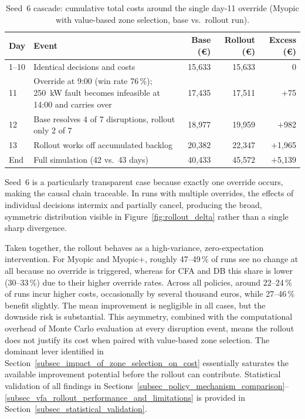 \documentclass[12pt,oneside]{article}
\begin{document}
\begin{table}[H]
\centering
\caption{Seed~6 cascade: cumulative total costs around the single day-11 override (Myopic with value-based zone selection, base vs.\ rollout run).}
\label{tab:seed6_cascade}
\begin{tabular}{lp{5.8cm}rrr}
\toprule
Day & Event & Base (€) & Rollout (€) & Excess (€) \\
\midrule
1--10 & Identical decisions and costs & 15{,}633 & 15{,}633 & 0 \\
11 & Override at 9:00 (win rate 76\,\%); 250~kW fault becomes infeasible at 14:00 and carries over & 17{,}435 & 17{,}511 & $+$75 \\
12 & Base resolves 4 of 7 disruptions, rollout only 2 of 7 & 18{,}977 & 19{,}959 & $+$982 \\
13 & Rollout works off accumulated backlog & 20{,}382 & 22{,}347 & $+$1{,}965 \\
End & Full simulation (42 vs.\ 43 days) & 40{,}433 & 45{,}572 & $+$5{,}139 \\
\bottomrule
\end{tabular}
\end{table}

Seed~6 is a particularly transparent case because exactly one override occurs, making the causal chain traceable. In runs with multiple overrides, the effects of individual decisions intermix and partially cancel, producing the broad, symmetric distribution visible in Figure~\ref{fig:rollout_delta} rather than a single sharp divergence.

Taken together, the rollout behaves as a high-variance, zero-expectation intervention. For Myopic and Myopic+, roughly 47--49\,\% of runs see no change at all because no override is triggered, whereas for CFA and DB this share is lower (30--33\,\%) due to their higher override rates. Across all policies, around 22--24\,\% of runs incur higher costs, occasionally by several thousand euros, while 27--46\,\% benefit slightly. The mean improvement is negligible in all cases, but the downside risk is substantial. This asymmetry, combined with the computational overhead of Monte Carlo evaluation at every disruption event, means the rollout does not justify its cost when paired with value-based zone selection. The dominant lever identified in Section~\ref{subsec_impact_of_zone_selection_on_cost} essentially saturates the available improvement potential before the rollout can contribute. Statistical validation of all findings in Sections~\ref{subsec_policy_mechanism_comparison}--\ref{subsec_vfa_rollout_performance_and_limitations} is provided in Section~\ref{subsec_statistical_validation}.
\end{document}
